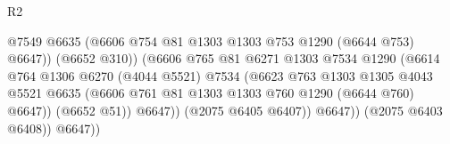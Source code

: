 \begin{lexlean}{R2}
\begin{coremodule}
                                                @7549
                                                @6635
                                                (@6606
                                                  @754
                                                  @81
                                                  @1303
                                                  @1303
                                                  @753
                                                  @1290
                                                  (@6644 @753)
                                                  @6647))
                                              (@6652 @310))
                                            (@6606
                                              @765
                                              @81
                                              @6271
                                              @1303
                                              @7534
                                              @1290
                                              (@6614
                                                @764
                                                @1306
                                                @6270
                                                (@4044 @5521)
                                                @7534
                                                (@6623
                                                  @763
                                                  @1303
                                                  @1305
                                                  @4043
                                                  @5521
                                                  @6635
                                                  (@6606
                                                    @761
                                                    @81
                                                    @1303
                                                    @1303
                                                    @760
                                                    @1290
                                                    (@6644 @760)
                                                    @6647))
                                                (@6652 @51))
                                              @6647))
                                          (@2075 @6405 @6407))
                                        @6647))
                                    (@2075 @6403 @6408))
                                  @6647))

\end{coremodule}
\end{lexlean}
